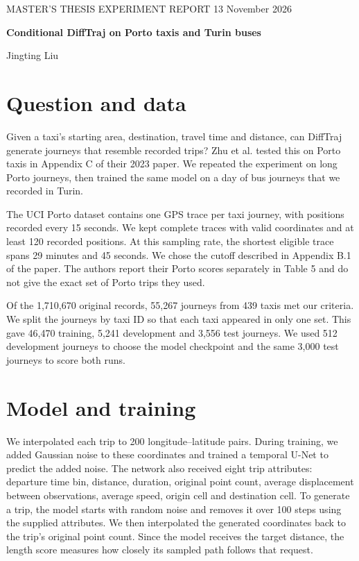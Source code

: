 \documentclass[11pt,a4paper]{article}
\begin{document}
{\small MASTER'S THESIS EXPERIMENT REPORT \hfill 13 November 2026}

{\LARGE\bfseries Conditional DiffTraj on Porto taxis and Turin buses\par}
Jingting Liu

\section*{Question and data}
Given a taxi's starting area, destination, travel time and distance, can DiffTraj generate journeys that resemble recorded trips? Zhu et al. tested this on Porto taxis in Appendix C of their 2023 paper. We repeated the experiment on long Porto journeys, then trained the same model on a day of bus journeys that we recorded in Turin.

The UCI Porto dataset contains one GPS trace per taxi journey, with positions recorded every 15 seconds. We kept complete traces with valid coordinates and at least 120 recorded positions. At this sampling rate, the shortest eligible trace spans 29 minutes and 45 seconds. We chose the cutoff described in Appendix B.1 of the paper. The authors report their Porto scores separately in Table 5 and do not give the exact set of Porto trips they used.

Of the 1,710,670 original records, 55,267 journeys from 439 taxis met our criteria. We split the journeys by taxi ID so that each taxi appeared in only one set. This gave 46,470 training, 5,241 development and 3,556 test journeys. We used 512 development journeys to choose the model checkpoint and the same 3,000 test journeys to score both runs.

\section*{Model and training}
We interpolated each trip to 200 longitude--latitude pairs. During training, we added Gaussian noise to these coordinates and trained a temporal U-Net to predict the added noise. The network also received eight trip attributes: departure time bin, distance, duration, original point count, average displacement between observations, average speed, origin cell and destination cell. To generate a trip, the model starts with random noise and removes it over 100 steps using the supplied attributes. We then interpolated the generated coordinates back to the trip's original point count. Since the model receives the target distance, the length score measures how closely its sampled path follows that request.
\end{document}
